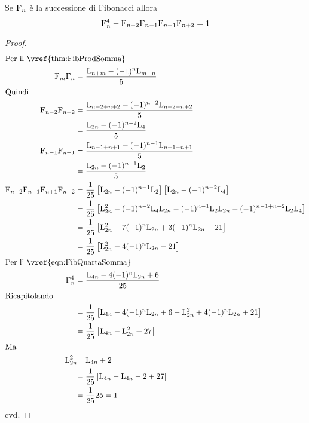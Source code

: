 \begin{thm}\label{thm:FibGelinCesaro}
	Se $\mathrm{F}_{n}$ è la successione di Fibonacci allora 
	\begin{equation}
	\mathrm{F}_{n}^4-\mathrm{F}_{n-2}\mathrm{F}_{n-1}\mathrm{F}_{n+1}\mathrm{F}_{n+2}=1
	\end{equation}\label{eqn:FibGelinCesaro}
\end{thm}
\begin{proof}
\begin{align*}
		\intertext{Per il~\vref{thm:FibProdSomma}}
	\Fib{m}\Fib{n}={}&\dfrac{\Luc{n+m}-(-1)^n\Luc{m-n}}{5}\\
	\intertext{Quindi}
	\Fib{n-2}\Fib{n+2}={}&\dfrac{\Luc{n-2+n+2}-(-1)^{n-2}\Luc{n+2-n+2}}{5}\\
={}&\dfrac{\Luc{2n}-(-1)^{n-2}\Luc{4}}{5}\\
	\Fib{n-1}\Fib{n+1}={}&\dfrac{\Luc{n-1+n+1}-(-1)^{n-1}\Luc{n+1-n+1}}{5}\\
={}&\dfrac{\Luc{2n}-(-1)^{n-1}\Luc{2}}{5}\\
	\Fib{n-2}\Fib{n-1}\Fib{n+1}\Fib{n+2}
={}&\dfrac{1}{25}\left[\Luc{2n}-(-1)^{n-1}\Luc{2}\right]\left[\Luc{2n}-(-1)^{n-2}\Luc{4}\right]\\
={}&\dfrac{1}{25}\left[\Luc{2n}^2-(-1)^{n-2}\Luc{4}\Luc{2n}-(-1)^{n-1}\Luc{2}\Luc{2n}-(-1)^{n-1+n-2}\Luc{2}\Luc{4}\right]\\
={}&\dfrac{1}{25}\left[\Luc{2n}^2-7(-1)^{n}\Luc{2n}+3(-1)^{n}\Luc{2n}-21\right]\\
={}&\dfrac{1}{25}\left[\Luc{2n}^2-4(-1)^{n}\Luc{2n}-21\right]\\
	\intertext{Per l'~\vref{eqn:FibQuartaSomma}}
	\Fib{n}^4={}&\dfrac{\Luc{4n}-4(-1)^n\Luc{2n}+6}{25}\\
	\intertext{Ricapitolando}
={}&\dfrac{1}{25}\left[\Luc{4n}-4(-1)^n\Luc{2n}+6-\Luc{2n}^2+4(-1)^{n}\Luc{2n}+21\right]\\
={}&\dfrac{1}{25}\left[\Luc{4n}-\Luc{2n}^2+27\right]\\
	\intertext{Ma}
	\Luc{2n}^2=&\Luc{4n}+2\\
={}&\dfrac{1}{25}\left[\Luc{4n}-\Luc{4n}-2+27\right]\\
={}&\dfrac{1}{25}25=1\\
\end{align*}
cvd.
\end{proof}
